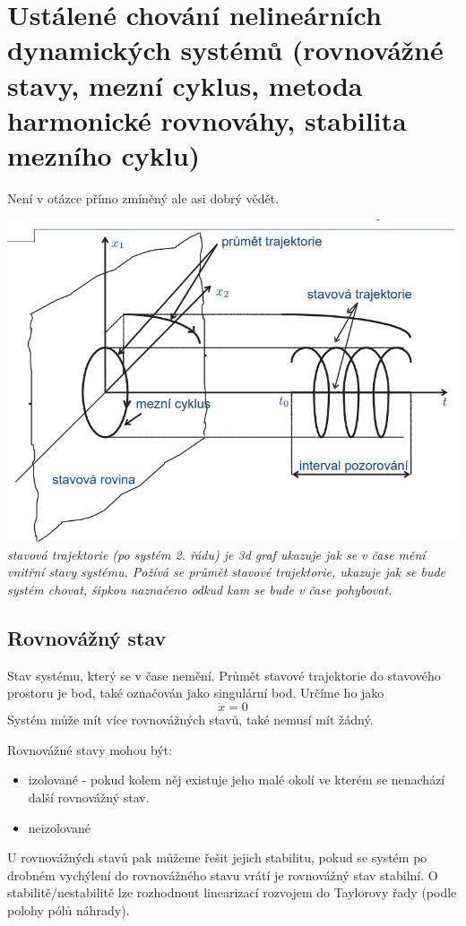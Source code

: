 \section{Ustálené chování nelineárních dynamických systémů (rovnovážné stavy, mezní cyklus, metoda
  harmonické rovnováhy, stabilita mezního cyklu)}

Není v otázce přímo zmíněný ale asi dobrý vědět.

\includegraphics[scale = 0.8]{img/trajektorie.png}
{
    \it stavová trajektorie (po systém 2. řádu) je 3d graf ukazuje jak se v čase mění vnitřní stavy systému.
    Požívá se průmět stavové trajektorie, ukazuje jak se bude systém chovat, šipkou naznačeno odkud kam se bude v čase pohybovat.
}
\subsection{Rovnovážný stav}
Stav systému, který se v čase nemění. Průmět stavové trajektorie do stavového prostoru je bod, také označován jako singulární bod. Určíme
ho jako \[ \dot{x} = 0 \]
Systém může mít více rovnovážných stavů, také nemusí mít žádný.

Rovnovážné stavy mohou být:
\begin{itemize}
    \item izolované - pokud kolem něj existuje jeho malé okolí ve kterém se nenachází další rovnovážný stav.
    \item neizolované
\end{itemize}

U rovnovážných stavů pak můžeme řešit jejich stabilitu, pokud se systém po drobném vychýlení do rovnovážného stavu vrátí je rovnovážný stav stabilní. O stabilitě/nestabilitě lze rozhodnout linearizací rozvojem do Taylorovy řady (podle polohy pólů náhrady).

